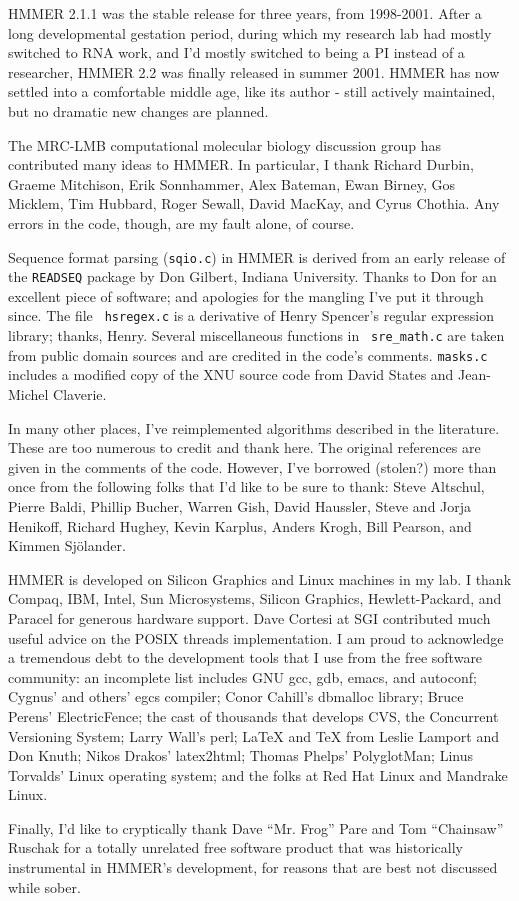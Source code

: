 HMMER 2.1.1 was the stable release for three years, from 1998-2001.
After a long developmental gestation period, during which my research
lab had mostly switched to RNA work, and I'd mostly switched to being
a PI instead of a researcher, HMMER 2.2 was finally released in summer
2001. HMMER has now settled into a comfortable middle age, like its
author - still actively maintained, but no dramatic new changes are
planned.

The MRC-LMB computational molecular biology discussion group has
contributed many ideas to HMMER. In particular, I thank Richard
Durbin, Graeme Mitchison, Erik Sonnhammer, Alex Bateman, Ewan Birney,
Gos Micklem, Tim Hubbard, Roger Sewall, David MacKay, and Cyrus
Chothia. Any errors in the code, though, are my fault alone, of
course.

Sequence format parsing ({\tt sqio.c}) in HMMER is derived from an
early release of the {\tt READSEQ} package by Don Gilbert, Indiana
University. Thanks to Don for an excellent piece of software; and
apologies for the mangling I've put it through since.  The file {\tt
hsregex.c} is a derivative of Henry Spencer's regular expression
library; thanks, Henry. Several miscellaneous functions in {\tt
sre\_math.c} are taken from public domain sources and are credited in
the code's comments. {\tt masks.c} includes a modified copy of the XNU
source code from David States and Jean-Michel Claverie.

In many other places, I've reimplemented algorithms described in the
literature. These are too numerous to credit and thank here. The
original references are given in the comments of the code. However,
I've borrowed (stolen?) more than once from the following folks that
I'd like to be sure to thank: Steve Altschul, Pierre Baldi, Phillip
Bucher, Warren Gish, David Haussler, Steve and Jorja Henikoff, Richard
Hughey, Kevin Karplus, Anders Krogh, Bill Pearson, and Kimmen
Sj\"{o}lander.

HMMER is developed on Silicon Graphics and Linux machines in my lab.
I thank Compaq, IBM, Intel, Sun Microsystems, Silicon Graphics,
Hewlett-Packard, and Paracel for generous hardware support. Dave
Cortesi at SGI contributed much useful advice on the POSIX threads
implementation. I am proud to acknowledge a tremendous debt to the
development tools that I use from the free software community: an
incomplete list includes GNU gcc, gdb, emacs, and autoconf; Cygnus'
and others' egcs compiler; Conor Cahill's dbmalloc library; Bruce
Perens' ElectricFence; the cast of thousands that develops CVS, the
Concurrent Versioning System; Larry Wall's perl; LaTeX and TeX from
Leslie Lamport and Don Knuth; Nikos Drakos' latex2html; Thomas Phelps'
PolyglotMan; Linus Torvalds' Linux operating system; and the folks at
Red Hat Linux and Mandrake Linux.

Finally, I'd like to cryptically thank Dave ``Mr. Frog'' Pare and Tom
``Chainsaw'' Ruschak for a totally unrelated free software product
that was historically instrumental in HMMER's development, for reasons
that are best not discussed while sober.
